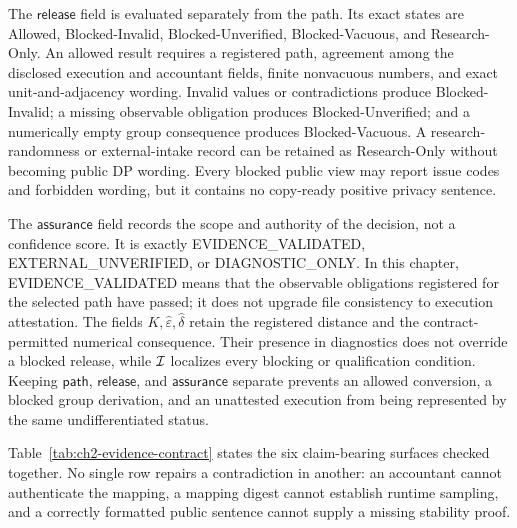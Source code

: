 The \(\mathsf{release}\) field is evaluated separately from the path.  Its exact
states are \textsf{Allowed}, \textsf{Blocked-Invalid},
\textsf{Blocked-Unverified}, \textsf{Blocked-Vacuous}, and
\textsf{Research-Only}.  An allowed result requires a registered path, agreement
among the disclosed execution and accountant fields, finite nonvacuous numbers,
and exact unit-and-adjacency wording.  Invalid values or contradictions produce
\textsf{Blocked-Invalid}; a missing observable obligation produces
\textsf{Blocked-Unverified}; and a numerically empty group consequence produces
\textsf{Blocked-Vacuous}.  A research-randomness or external-intake record can be
retained as \textsf{Research-Only} without becoming public DP wording.  Every
blocked public view may report issue codes and forbidden wording, but it contains
no copy-ready positive privacy sentence.

The \(\mathsf{assurance}\) field records the scope and authority of the decision,
not a confidence score.  It is exactly \textsf{EVIDENCE\_VALIDATED},
\textsf{EXTERNAL\_UNVERIFIED}, or \textsf{DIAGNOSTIC\_ONLY}.  In this chapter,
\textsf{EVIDENCE\_VALIDATED} means that the observable obligations registered for
the selected path have passed; it does not upgrade file consistency to execution
attestation.  The fields
\(K,\widehat{\varepsilon},\widehat{\delta}\) retain the registered distance and
the contract-permitted numerical consequence.  Their presence in diagnostics
does not override a blocked release, while \(\mathcal{I}\) localizes every blocking
or qualification condition.  Keeping
\(\mathsf{path}\), \(\mathsf{release}\), and \(\mathsf{assurance}\) separate
prevents an allowed conversion, a blocked group derivation, and an unattested
execution from being represented by the same undifferentiated status.

Table~\ref{tab:ch2-evidence-contract} states the six claim-bearing surfaces checked
together.  No single row repairs a contradiction in another: an accountant cannot
authenticate the mapping, a mapping digest cannot establish runtime sampling, and
a correctly formatted public sentence cannot supply a missing stability proof.

